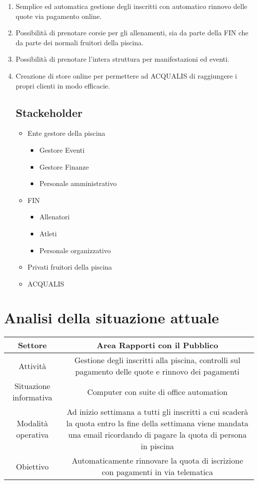 \documentclass[11pt]{article} %
\newcommand{\AnalisiSituazioneAttualeTabella}[5]{
	\begin{tabulary}{\textwidth}{|C|C|}
		\hline
		Settore & #1 \\ \hline
		Attività & #2 \\ \hline
		Situazione informativa & #3 \\ \hline
		Modalità operativa & #4 \\ \hline
		Obiettivo & #5 \\
		\hline
	\end{tabulary}
}
\begin{document}
\begin{enumerate}
	\item Semplice ed automatica gestione degli inscritti con automatico rinnovo delle quote via pagamento online.  

	\item Possibilità di prenotare corsie per gli allenamenti, sia da parte della FIN che da parte dei normali fruitori della piscina.

	\item Possibilità di prenotare l'intera struttura per manifestazioni ed eventi.

	\item Creazione di store online per permettere ad ACQUALIS di raggiungere i propri clienti in modo efficacie.

\subsection{Stackeholder}

\begin{itemize}
	\item Ente gestore della piscina
	\begin{itemize}
		\item Gestore Eventi
		\item Gestore Finanze
		\item Personale amministrativo
	\end{itemize}
	\item FIN
	\begin{itemize}
		\item Allenatori
		\item Atleti
		\item Personale organizzativo
	\end{itemize}
	\item Privati fruitori della piscina
	\item ACQUALIS
\end{itemize}

\end{enumerate}

\section{Analisi della situazione attuale}

\AnalisiSituazioneAttualeTabella
	{Area Rapporti con il Pubblico}
	{Gestione degli inscritti alla piscina, controlli sul pagamento delle quote e rinnovo dei pagamenti}
	{Computer con suite di office automation}
	{Ad inizio settimana a tutti gli inscritti a cui scaderà la quota entro la fine della settimana viene mandata una email ricordando di pagare la quota di persona in piscina}
	{Automaticamente rinnovare la quota di iscrizione con pagamenti in via telematica}
\end{document}
